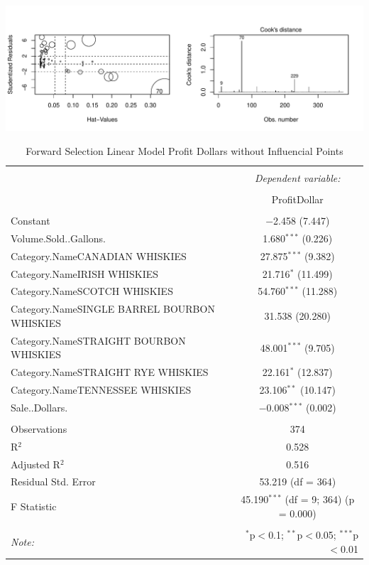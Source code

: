 \documentclass[]{elsarticle} %
\makeatletter
\def\maxwidth{\ifdim\Gin@nat@width>\linewidth\linewidth
\else\Gin@nat@width\fi}
\let\Oldincludegraphics\includegraphics
\renewcommand{\includegraphics}[1]{\Oldincludegraphics[width=\maxwidth]{#1}}
\makeatother
\begin{document}
\includegraphics{Final_Project_files/figure-latex/unnamed-chunk-18-1.pdf}

\begin{table}[!htbp] \centering 
  \caption{Forward Selection Linear Model Profit Dollars without Influencial Points} 
  \label{} 
\normalsize 
\begin{tabular}{@{\extracolsep{5pt}}lc} 
\\[-1.8ex]\hline 
\hline \\[-1.8ex] 
 & \multicolumn{1}{c}{\textit{Dependent variable:}} \\ 
\cline{2-2} 
\\[-1.8ex] & ProfitDollar \\ 
\hline \\[-1.8ex] 
 Constant & $-$2.458 (7.447) \\ 
  Volume.Sold..Gallons. & 1.680$^{***}$ (0.226) \\ 
  Category.NameCANADIAN WHISKIES & 27.875$^{***}$ (9.382) \\ 
  Category.NameIRISH WHISKIES & 21.716$^{*}$ (11.499) \\ 
  Category.NameSCOTCH WHISKIES & 54.760$^{***}$ (11.288) \\ 
  Category.NameSINGLE BARREL BOURBON WHISKIES & 31.538 (20.280) \\ 
  Category.NameSTRAIGHT BOURBON WHISKIES & 48.001$^{***}$ (9.705) \\ 
  Category.NameSTRAIGHT RYE WHISKIES & 22.161$^{*}$ (12.837) \\ 
  Category.NameTENNESSEE WHISKIES & 23.106$^{**}$ (10.147) \\ 
  Sale..Dollars. & $-$0.008$^{***}$ (0.002) \\ 
 \hline \\[-1.8ex] 
Observations & 374 \\ 
R$^{2}$ & 0.528 \\ 
Adjusted R$^{2}$ & 0.516 \\ 
Residual Std. Error & 53.219 (df = 364) \\ 
F Statistic & 45.190$^{***}$ (df = 9; 364)  (p = 0.000) \\ 
\hline 
\hline \\[-1.8ex] 
\textit{Note:}  & \multicolumn{1}{r}{$^{*}$p$<$0.1; $^{**}$p$<$0.05; $^{***}$p$<$0.01} \\ 
\end{tabular} 
\end{table}
\end{document}
